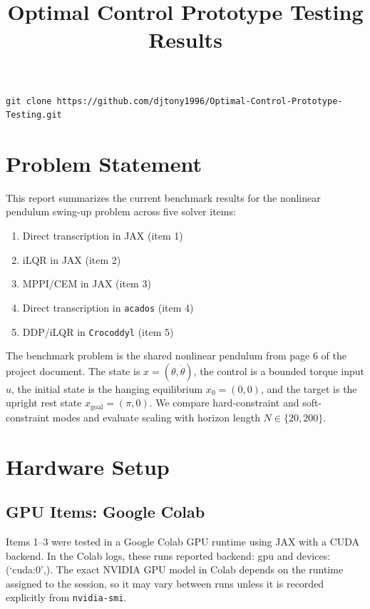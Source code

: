 \documentclass[11pt]{article}
\title{Optimal Control Prototype Testing Results}
\author{}
\date{}
\begin{document}
\maketitle

\begin{verbatim}
git clone https://github.com/djtony1996/Optimal-Control-Prototype-Testing.git
\end{verbatim}

\section{Problem Statement}

This report summarizes the current benchmark results for the nonlinear pendulum
swing-up problem across five solver items:
\begin{enumerate}
    \item Direct transcription in JAX (item 1)
    \item iLQR in JAX (item 2)
    \item MPPI/CEM in JAX (item 3)
    \item Direct transcription in \texttt{acados} (item 4)
    \item DDP/iLQR in \texttt{Crocoddyl} (item 5)
\end{enumerate}

The benchmark problem is the shared nonlinear pendulum from page 6 of the
project document. The state is $x = (\theta, \dot{\theta})$, the control is a
bounded torque input $u$, the initial state is the hanging equilibrium
$x_0 = (0, 0)$, and the target is the upright rest state
$x_{\mathrm{goal}} = (\pi, 0)$. We compare hard-constraint and soft-constraint
modes and evaluate scaling with horizon length $N \in \{20, 200\}$.

\section{Hardware Setup}

\subsection{GPU Items: Google Colab}

Items 1--3 were tested in a Google Colab GPU runtime using JAX with a CUDA
backend. In the Colab logs, these runs reported
backend: gpu and devices: (`cuda:0',). The exact NVIDIA GPU
model in Colab depends on the runtime assigned to the session, so it may vary
between runs unless it is recorded explicitly from \texttt{nvidia-smi}.
\end{document}
